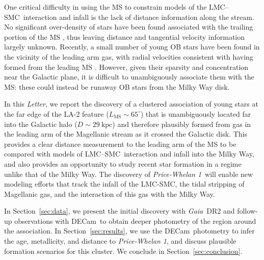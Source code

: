 \documentclass[twocolumn]{aastex62}
\newcommand{\acronym}[1]{{\small{#1}}}
\newcommand{\gaia}{\textsl{Gaia}}
\newcommand{\decam}{DECam}
\newcommand{\DR}[1]{\acronym{DR#1}}
\newcommand{\articlename}{\textsl{Letter}}
\newcommand{\sectionname}{Section}
\newcommand{\clustername}{\textsl{Price-Whelan 1}}
\newcommand{\lmcsmc}{LMC--SMC}
\newcommand{\cldist}{\ensuremath{29~\textrm{kpc}}}
\begin{document}
One critical difficulty in using the MS to constrain models of the \lmcsmc\ interaction and infall is the lack of distance information along the stream.
No significant over-density of stars have been found associated with the trailing portion of the MS \citep{Guhathakurta:1998}, thus leaving distance and tangential velocity information largely unknown.
Recently, a small number of young OB stars have been found in the vicinity of the leading arm gas, with radial velocities consistent with having formed from the leading MS \citep{Casetti-Dinescu:2014, Zhang:2017}.
However, given their sparsity and concentration near the Galactic plane, it is difficult to unambiguously associate them with the MS: these could instead be runaway OB stars from the Milky Way disk.

In this \articlename, we report the discovery of a clustered association of young stars at the far edge of the LA-2 feature ($L_{\textrm{MS}} \sim 65^\circ$) that is unambiguously located far into the Galactic halo ($D \sim \cldist$) and therefore plausibly formed from gas in the leading arm of the Magellanic stream as it crossed the Galactic disk.
This provides a clear distance measurement to the leading arm of the MS to be compared with models of \lmcsmc\ interaction and infall into the Milky Way, and also provides an opportunity to study recent star formation in a regime unlike that of the Milky Way.
The discovery of \clustername\ will enable new modeling efforts that track the infall of the LMC-SMC, the tidal stripping of Magellanic gas, and the interaction of this gas with the Milky Way.

In \sectionname~\ref{sec:data}, we present the initial discovery with \gaia\ \DR{2} and follow-up observations with \decam\ to obtain deeper photometry of the region around the association.
In \sectionname~\ref{sec:results}, we use the \decam\ photometry to infer the age, metallicity, and distance to \clustername, and discuss plausible formation scenarios for this cluster.
We conclude in \sectionname~\ref{sec:conclusion}.
\end{document}
